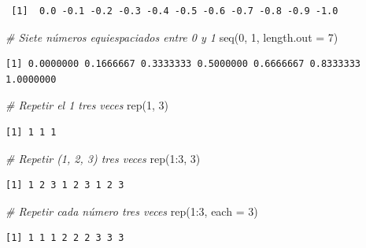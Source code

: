 \documentclass[
]{book}
\newenvironment{Shaded}{\begin{snugshade}}{\end{snugshade}}
\newcommand{\AttributeTok}[1]{\textcolor[rgb]{0.77,0.63,0.00}{#1}}
\newcommand{\CommentTok}[1]{\textcolor[rgb]{0.56,0.35,0.01}{\textit{#1}}}
\newcommand{\DecValTok}[1]{\textcolor[rgb]{0.00,0.00,0.81}{#1}}
\newcommand{\FunctionTok}[1]{\textcolor[rgb]{0.00,0.00,0.00}{#1}}
\newcommand{\NormalTok}[1]{#1}
\newcommand{\SpecialCharTok}[1]{\textcolor[rgb]{0.00,0.00,0.00}{#1}}
\begin{document}
\begin{verbatim}
 [1]  0.0 -0.1 -0.2 -0.3 -0.4 -0.5 -0.6 -0.7 -0.8 -0.9 -1.0
\end{verbatim}

\begin{Shaded}
\begin{Highlighting}[]
\CommentTok{\# Siete números equiespaciados entre 0 y 1}
\FunctionTok{seq}\NormalTok{(}\DecValTok{0}\NormalTok{, }\DecValTok{1}\NormalTok{, }\AttributeTok{length.out =} \DecValTok{7}\NormalTok{)}
\end{Highlighting}
\end{Shaded}

\begin{verbatim}
[1] 0.0000000 0.1666667 0.3333333 0.5000000 0.6666667 0.8333333 1.0000000
\end{verbatim}

\begin{Shaded}
\begin{Highlighting}[]
\CommentTok{\# Repetir el 1 tres veces}
\FunctionTok{rep}\NormalTok{(}\DecValTok{1}\NormalTok{, }\DecValTok{3}\NormalTok{)}
\end{Highlighting}
\end{Shaded}

\begin{verbatim}
[1] 1 1 1
\end{verbatim}

\begin{Shaded}
\begin{Highlighting}[]
\CommentTok{\# Repetir (1, 2, 3) tres veces}
\FunctionTok{rep}\NormalTok{(}\DecValTok{1}\SpecialCharTok{:}\DecValTok{3}\NormalTok{, }\DecValTok{3}\NormalTok{)}
\end{Highlighting}
\end{Shaded}

\begin{verbatim}
[1] 1 2 3 1 2 3 1 2 3
\end{verbatim}

\begin{Shaded}
\begin{Highlighting}[]
\CommentTok{\# Repetir cada número tres veces}
\FunctionTok{rep}\NormalTok{(}\DecValTok{1}\SpecialCharTok{:}\DecValTok{3}\NormalTok{, }\AttributeTok{each =} \DecValTok{3}\NormalTok{)}
\end{Highlighting}
\end{Shaded}

\begin{verbatim}
[1] 1 1 1 2 2 2 3 3 3
\end{verbatim}
\end{document}
